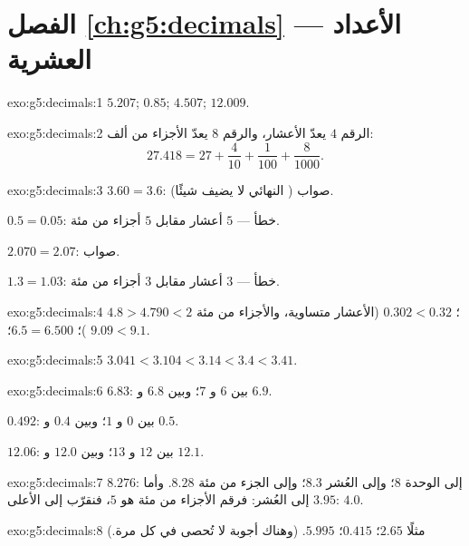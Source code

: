 \section*{الفصل \ref{ch:g5:decimals} --- الأعداد العشرية}

\begin{solution}{exo:g5:decimals:1}
$5.207$; \quad $0.85$; \quad $4.507$; \quad $12.009$.
\end{solution}

\begin{solution}{exo:g5:decimals:2}
الرقم $4$ يعدّ الأعشار، والرقم $8$ يعدّ الأجزاء من ألف:
\[
27.418 = 27 + \frac{4}{10} + \frac{1}{100} + \frac{8}{1000}.
\]
\end{solution}

\begin{solution}{exo:g5:decimals:3}
$3.60 = 3.6$: صواب ( النهائي لا يضيف شيئًا).

$0.5 = 0.05$: خطأ --- $5$ أعشار مقابل $5$ أجزاء من مئة.

$2.070 = 2.07$: صواب.

$1.3 = 1.03$: خطأ --- $3$ أعشار مقابل $3$ أجزاء من مئة.
\end{solution}

\begin{solution}{exo:g5:decimals:4}
$4.8 > 4.79$؛ \quad $0.302 < 0.32$ (الأعشار متساوية، والأجزاء من مئة
$0 < 2$)؛ \quad $6.5 = 6.500$؛ \quad $9.09 < 9.1$.
\end{solution}

\begin{solution}{exo:g5:decimals:5}
$3.041 < 3.104 < 3.14 < 3.4 < 3.41$.
\end{solution}

\begin{solution}{exo:g5:decimals:6}
$6.83$: بين $6$ و $7$؛ وبين $6.8$ و $6.9$.

$0.492$: بين $0$ و $1$؛ وبين $0.4$ و $0.5$.

$12.06$: بين $12$ و $13$؛ وبين $12.0$ و $12.1$.
\end{solution}

\begin{solution}{exo:g5:decimals:7}
$8.276$: إلى الوحدة $8$؛ وإلى العُشر $8.3$؛ وإلى الجزء من مئة
$8.28$. وأما $3.95$ إلى العُشر: فرقم الأجزاء من مئة هو $5$، فنقرّب
إلى الأعلى: $4.0$.
\end{solution}

\begin{solution}{exo:g5:decimals:8}
مثلًا $2.65$؛ \quad $0.415$؛ \quad $5.995$. (وهناك أجوبة لا
تُحصى في كل مرة.)
\end{solution}

